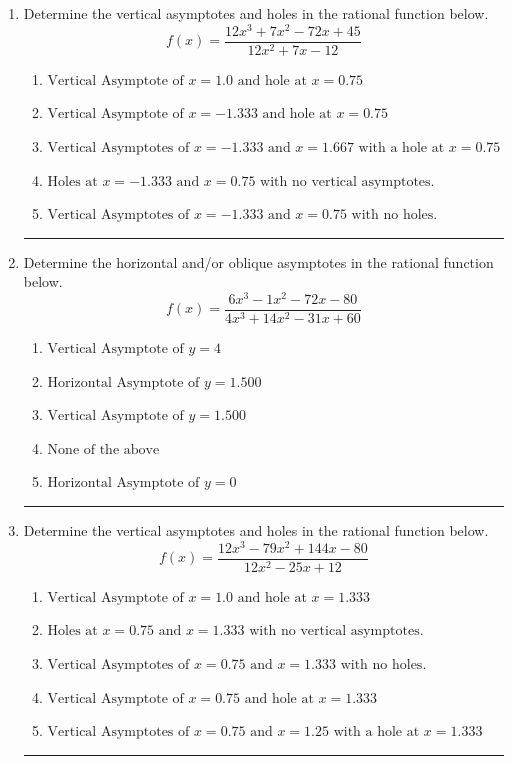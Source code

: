 \documentclass[14pt]{extbook}
\newcommand{\litem}[1]{\item#1\hspace*{-1cm}\rule{\textwidth}{0.4pt}}
\begin{document}
\begin{enumerate}
{\begin{enumerate}[label=\Alph*.]
\end{enumerate} }
\litem{
Determine the vertical asymptotes and holes in the rational function below.\[ f(x) = \frac{12x^{3} +7 x^{2} -72 x + 45}{12x^{2} +7 x -12} \]\begin{enumerate}[label=\Alph*.]
\item \( \text{Vertical Asymptote of } x = 1.0 \text{ and hole at } x = 0.75 \)
\item \( \text{Vertical Asymptote of } x = -1.333 \text{ and hole at } x = 0.75 \)
\item \( \text{Vertical Asymptotes of } x = -1.333 \text{ and } x = 1.667 \text{ with a hole at } x = 0.75 \)
\item \( \text{Holes at } x = -1.333 \text{ and } x = 0.75 \text{ with no vertical asymptotes.} \)
\item \( \text{Vertical Asymptotes of } x = -1.333 \text{ and } x = 0.75 \text{ with no holes.} \)

\end{enumerate} }
\litem{
Determine the horizontal and/or oblique asymptotes in the rational function below.\[ f(x) = \frac{6x^{3} -1 x^{2} -72 x -80}{4x^{3} +14 x^{2} -31 x + 60} \]\begin{enumerate}[label=\Alph*.]
\item \( \text{Vertical Asymptote of } y = 4  \)
\item \( \text{Horizontal Asymptote of } y = 1.500  \)
\item \( \text{Vertical Asymptote of } y = 1.500  \)
\item \( \text{None of the above} \)
\item \( \text{Horizontal Asymptote of } y = 0  \)

\end{enumerate} }
\litem{
Determine the vertical asymptotes and holes in the rational function below.\[ f(x) = \frac{12x^{3} -79 x^{2} +144 x -80}{12x^{2} -25 x + 12} \]\begin{enumerate}[label=\Alph*.]
\item \( \text{Vertical Asymptote of } x = 1.0 \text{ and hole at } x = 1.333 \)
\item \( \text{Holes at } x = 0.75 \text{ and } x = 1.333 \text{ with no vertical asymptotes.} \)
\item \( \text{Vertical Asymptotes of } x = 0.75 \text{ and } x = 1.333 \text{ with no holes.} \)
\item \( \text{Vertical Asymptote of } x = 0.75 \text{ and hole at } x = 1.333 \)
\item \( \text{Vertical Asymptotes of } x = 0.75 \text{ and } x = 1.25 \text{ with a hole at } x = 1.333 \)


\end{enumerate}}
\end{enumerate}
\end{document}
